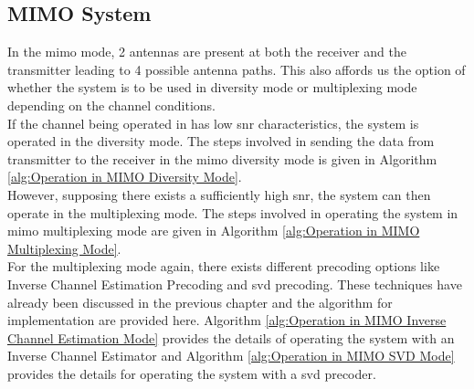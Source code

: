 \subsection{MIMO System}
In the \acrlong{mimo} mode, 2 antennas are present at both the receiver and the transmitter leading to 4 possible antenna paths. This also affords us the option of whether the system is to be used in diversity mode or multiplexing mode depending on the channel conditions.\\
If the channel being operated in has low \acrshort{snr} characteristics, the system is operated in the diversity mode. The steps involved in sending the data from transmitter to the receiver in the \acrshort{mimo} diversity mode is given in Algorithm \ref{alg:Operation in MIMO Diversity Mode}.\\
However, supposing there exists a sufficiently high \acrshort{snr}, the system can then operate in the multiplexing mode. The steps involved in operating the system in \acrshort{mimo} multiplexing mode are given in Algorithm \ref{alg:Operation in MIMO Multiplexing Mode}.\\

For the multiplexing mode again, there exists different precoding options like Inverse Channel Estimation Precoding and \acrlong{svd} precoding. These techniques have already been discussed in the previous chapter and the algorithm for implementation are provided here. Algorithm \ref{alg:Operation in MIMO Inverse Channel Estimation Mode} provides the details of operating the system with an Inverse Channel Estimator and Algorithm \ref{alg:Operation in MIMO SVD Mode} provides the details for operating the system with a \acrshort{svd} precoder.\\

